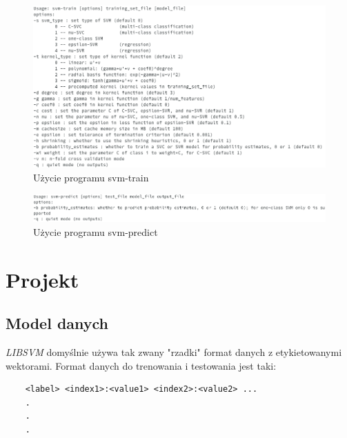 \documentclass[paper=a4, fontsize=11pt]{scrartcl} %
\numberwithin{equation}{section} %
\numberwithin{figure}{section} %
\begin{document}
    \begin{figure}[H]
        \begin{center}
            \includegraphics[scale=0.6]{./img/svm_train_usage.png}
            \caption{Użycie programu svm-train}
            \label{fig:train_usage}
        \end{center}
    \end{figure}

    \begin{figure}[H]
        \begin{center}
            \includegraphics[scale=0.6]{./img/svm_predict_usage.png}
            \caption{Użycie programu svm-predict}
            \label{fig:predict_usage}
        \end{center}
    \end{figure}

\newpage 
\section{Projekt} %
\subsection{Model danych}
    \par \textit{LIBSVM} domyślnie używa tak zwany "rzadki" format danych z etykietowanymi
    wektorami. Format danych do trenowania i testowania jest taki:

    \begin{verbatim}
    <label> <index1>:<value1> <index2>:<value2> ...
    .
    .
    .
    \end{verbatim}
\end{document}
